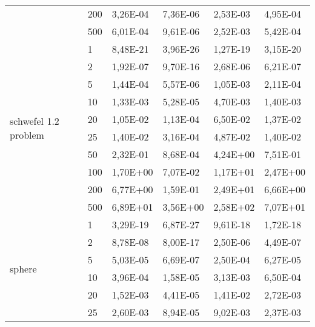 \begin{longtable}[c]{|p{3.5cm}|l|l|l|l|l|}
                                       & 200       & 3,26E-04 & 7,36E-06 & 2,53E-03 & 4,95E-04 \\ \cline{2-6} 
                                       & 500       & 6,01E-04 & 9,61E-06 & 2,52E-03 & 5,42E-04 \\ \hline
\multirow[t]{10}{*}{schwefel 1.2 problem} & 1         & 8,48E-21 & 3,96E-26 & 1,27E-19 & 3,15E-20 \\ \cline{2-6} 
                                       & 2         & 1,92E-07 & 9,70E-16 & 2,68E-06 & 6,21E-07 \\ \cline{2-6} 
                                       & 5         & 1,44E-04 & 5,57E-06 & 1,05E-03 & 2,11E-04 \\ \cline{2-6} 
                                       & 10        & 1,33E-03 & 5,28E-05 & 4,70E-03 & 1,40E-03 \\ \cline{2-6} 
                                       & 20        & 1,05E-02 & 1,13E-04 & 6,50E-02 & 1,37E-02 \\ \cline{2-6} 
                                       & 25        & 1,40E-02 & 3,16E-04 & 4,87E-02 & 1,40E-02 \\ \cline{2-6} 
                                       & 50        & 2,32E-01 & 8,68E-04 & 4,24E+00 & 7,51E-01 \\ \cline{2-6} 
                                       & 100       & 1,70E+00 & 7,07E-02 & 1,17E+01 & 2,47E+00 \\ \cline{2-6} 
                                       & 200       & 6,77E+00 & 1,59E-01 & 2,49E+01 & 6,66E+00 \\ \cline{2-6} 
                                       & 500       & 6,89E+01 & 3,56E+00 & 2,58E+02 & 7,07E+01 \\ \hline
\multirow[t]{10}{*}{sphere}               & 1         & 3,29E-19 & 6,87E-27 & 9,61E-18 & 1,72E-18 \\ \cline{2-6} 
                                       & 2         & 8,78E-08 & 8,00E-17 & 2,50E-06 & 4,49E-07 \\ \cline{2-6} 
                                       & 5         & 5,03E-05 & 6,69E-07 & 2,50E-04 & 6,27E-05 \\ \cline{2-6} 
                                       & 10        & 3,96E-04 & 1,58E-05 & 3,13E-03 & 6,50E-04 \\ \cline{2-6} 
                                       & 20        & 1,52E-03 & 4,41E-05 & 1,41E-02 & 2,72E-03 \\ \cline{2-6} 
                                       & 25        & 2,60E-03 & 8,94E-05 & 9,02E-03 & 2,37E-03 \\ \cline{2-6} 

\end{longtable}
